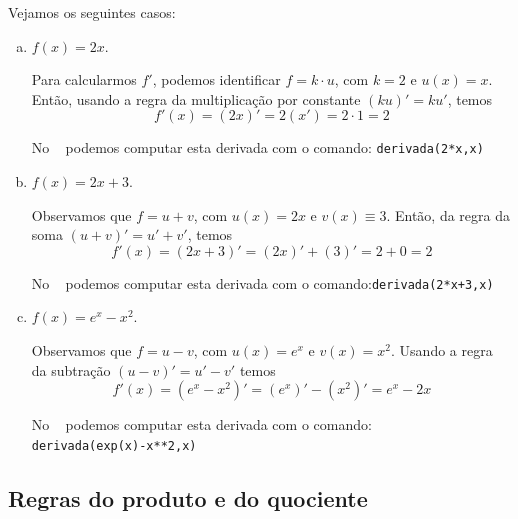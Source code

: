 \cleardoublepage\documentclass[../main.tex]{subfiles}
\begin{document}
\begin{ex}
  Vejamos os seguintes casos:
  \begin{enumerate}[a)]
  \item $f(x) = 2x$.

    Para calcularmos $f'$, podemos identificar $f = k\cdot u$, com $k=2$ e $u(x) = x$. Então, usando a regra da multiplicação por constante $(ku)' = ku'$, temos
    \begin{equation*}
      f'(x) = (2x)' = 2(x') = 2\cdot 1 = 2
    \end{equation*}

  
  No \geogebra~ podemos computar esta derivada com o comando: \verb+derivada(2*x,x)+
  \item $f(x) = 2x + 3$.

    Observamos que $f = u + v$, com $u(x) = 2x$ e $v(x)\equiv 3$. Então, da regra da soma $(u+v)' = u' + v'$, temos
    \begin{equation*}
      f'(x) = (2x + 3)' = (2x)' + (3)' = 2 + 0 = 2
    \end{equation*}

    
    No \geogebra~ podemos computar esta derivada com o comando:\verb|derivada(2*x+3,x)|
  \item $f(x) = e^x - x^2$.

    Observamos que $f = u-v$, com $u(x) = e^x$ e $v(x)= x^2$. Usando a regra da subtração $(u-v)' = u' - v'$ temos
    \begin{equation*}
      f'(x) = (e^x - x^2)' = (e^x)' - (x^2)' = e^x - 2x    \end{equation*}

    
    No \geogebra~ podemos computar esta derivada com o comando:\\ \verb+derivada(exp(x)-x**2,x)+
  
  \end{enumerate}
\end{ex}

\subsection{Regras do produto e do quociente}
\end{document}
